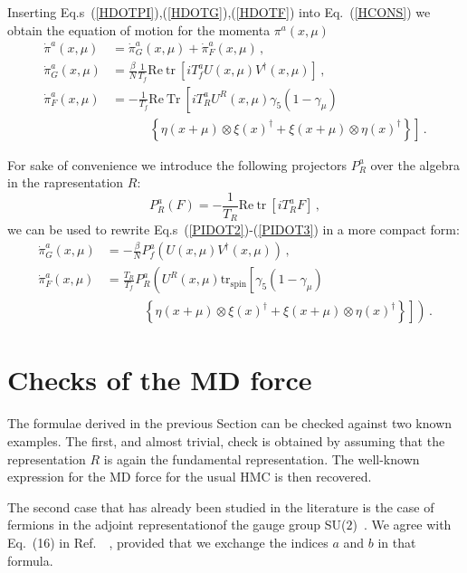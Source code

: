 \documentclass{article}[12pt]
\begin{document}
Inserting Eq.s~(\ref{HDOTPI}),(\ref{HDOTG}),(\ref{HDOTF}) into Eq.~(\ref{HCONS}) we obtain the equation of motion
for the momenta $\pi^a(x,\mu)$
\begin{align}
\dot\pi^a(x,\mu) &= \dot\pi^a_G(x,\mu) + \dot\pi^a_F(x,\mu) \, , \label{PIDOT1}\\
\dot\pi^a_G(x,\mu) &= \frac{\beta}{N} \frac{1}{T_f} \mathrm{Re\ tr\ } \left[ i T^a_f U(x,\mu) V^\dagger(x,\mu) \right] \, ,\label{PIDOT2}\\
\dot\pi^a_F(x,\mu) &=-\frac{1}{T_f} \mathrm{Re\ Tr\ } \left[ iT^a_R U^R(x,\mu) \gamma_5 (1-\gamma_\mu) \right. \nonumber\\
										&\quad\quad\quad	\left. \left\{ \eta(x+\mu)\otimes\xi(x)^\dagger + \xi(x+\mu)\otimes\eta(x)^\dagger \right\} \right]\, . \label{PIDOT3}
\end{align}

For sake of convenience we introduce the following projectors $P^a_R$ over the algebra in the rapresentation $R$:
\begin{equation}
P^a_R ( F ) = - \frac{1}{T_R} \mathrm{Re\ tr\ } \left[ i T^a_R F \right] \, ,
\end{equation}
we can be used to rewrite Eq.s~(\ref{PIDOT2})-(\ref{PIDOT3}) in a more compact form:
\begin{align}
\dot\pi^a_G(x,\mu) &= - \frac{\beta}{N} P^a_f \left( U(x,\mu) V^\dagger(x,\mu) \right) \, ,\\
\dot\pi^a_F(x,\mu) &= \frac{T_R}{T_f} P^a_R \left( U^R(x,\mu) \mathrm{tr_{spin}} \left[ \gamma_5 (1-\gamma_\mu) \right. \right. \nonumber\\
										&\quad\quad\quad	\left. \left. \left\{ \eta(x+\mu)\otimes\xi(x)^\dagger + \xi(x+\mu)\otimes\eta(x)^\dagger \right\} \right] \right)\, . \label{HFFORCE}
\end{align}

\section{Checks of the MD force}
The formulae derived in the previous Section can be checked against two
known examples. The first, and almost trivial, check is obtained by
assuming that the representation $R$ is again the fundamental
representation. The well-known expression for the MD force for the
usual HMC is then recovered. 

The second case that has already been studied in the literature is the
case of fermions in the adjoint representationof the gauge group
SU($2$)~\cite{Donini:1996nr}. We agree with Eq.~(16) in
Ref.~~\cite{Donini:1996nr}, provided that we exchange the indices $a$
and $b$ in that formula.
\end{document}
